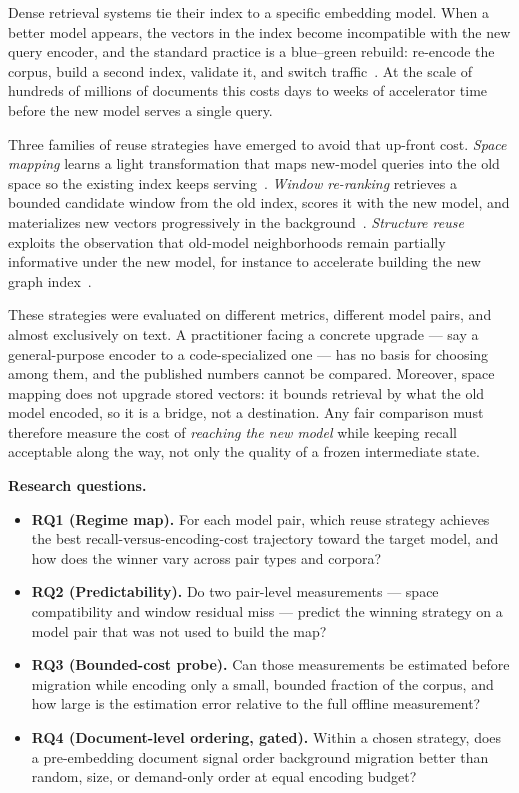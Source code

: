 \documentclass[conference]{IEEEtran}
\begin{document}
Dense retrieval systems tie their index to a specific embedding model. When a better
model appears, the vectors in the index become incompatible with the new query
encoder, and the standard practice is a blue--green rebuild: re-encode the corpus,
build a second index, validate it, and switch traffic~\cite{zilliz-migration}. At the
scale of hundreds of millions of documents this costs days to weeks of accelerator
time before the new model serves a single query.

Three families of reuse strategies have emerged to avoid that up-front cost.
\emph{Space mapping} learns a light transformation that maps new-model queries into the
old space so the existing index keeps serving~\cite{drift-adapter}.
\emph{Window re-ranking} retrieves a bounded candidate window from the old index,
scores it with the new model, and materializes new vectors progressively in the
background~\cite{embedflow,thaw-anon}. \emph{Structure reuse} exploits the observation
that old-model neighborhoods remain partially informative under the new model, for
instance to accelerate building the new graph index~\cite{dgm}.

These strategies were evaluated on different metrics, different model pairs, and
almost exclusively on text. A practitioner facing a concrete upgrade --- say a
general-purpose encoder to a code-specialized one --- has no basis for choosing among
them, and the published numbers cannot be compared. Moreover, space mapping does not
upgrade stored vectors: it bounds retrieval by what the old model encoded, so it is a
bridge, not a destination. Any fair comparison must therefore measure the cost of
\emph{reaching the new model} while keeping recall acceptable along the way, not only
the quality of a frozen intermediate state.

\textbf{Research questions.}
\begin{itemize}
\item \textbf{RQ1 (Regime map).} For each model pair, which reuse strategy achieves the
best recall-versus-encoding-cost trajectory toward the target model, and how does the
winner vary across pair types and corpora?
\item \textbf{RQ2 (Predictability).} Do two pair-level measurements --- space
compatibility and window residual miss --- predict the winning strategy on a model
pair that was not used to build the map?
\item \textbf{RQ3 (Bounded-cost probe).} Can those measurements be estimated before
migration while encoding only a small, bounded fraction of the corpus, and how large
is the estimation error relative to the full offline measurement?
\item \textbf{RQ4 (Document-level ordering, gated).} Within a chosen strategy, does a
pre-embedding document signal order background migration better than random, size,
or demand-only order at equal encoding budget?
\end{itemize}
\end{document}
